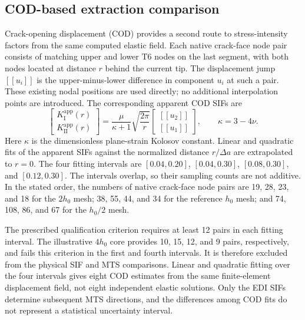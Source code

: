 \documentclass[11pt]{article}
\begin{document}
\subsection{COD-based extraction comparison}
\label{sec:cod-extraction}
Crack-opening displacement (COD) provides a second route to
stress-intensity factors from the same computed elastic field.
Each native crack-face node pair consists of matching upper and
lower T6 nodes on the last segment, with both nodes located at
distance $r$ behind the current tip. The displacement jump
$[\![u_i]\!]$ is the upper-minus-lower difference in component
$u_i$ at such a pair. These existing nodal positions are used
directly; no additional interpolation points are introduced.
The corresponding apparent COD SIFs are
\begin{equation}
 \begin{bmatrix}K_{\mathrm{I}}^{\mathrm{app}}(r)\\K_{\mathrm{II}}^{\mathrm{app}}(r)\end{bmatrix}
 =\frac{\mu}{\kappa+1}\sqrt{\frac{2\pi}{r}}
 \begin{bmatrix}{[\![u_2]\!]}\\{[\![u_1]\!]}\end{bmatrix},
 \qquad \kappa=3-4\nu.\label{eq:cod}
\end{equation}
Here $\kappa$ is the dimensionless plane-strain Kolosov constant.
Linear and quadratic fits of the apparent SIFs against the normalized
distance $r/\Delta a$ are extrapolated to $r=0$. The four fitting
intervals are $[0.04,0.20]$, $[0.04,0.30]$, $[0.08,0.30]$, and
$[0.12,0.30]$. The intervals overlap, so their sampling counts are
not additive. In the stated order, the numbers of native crack-face
node pairs are 19, 28, 23, and 18 for the $2h_0$ mesh;
38, 55, 44, and 34 for the reference $h_0$ mesh; and
74, 108, 86, and 67 for the $h_0/2$ mesh.

The prescribed qualification criterion requires at least 12 pairs
in each fitting interval. The illustrative $4h_0$ core provides
10, 15, 12, and 9 pairs, respectively, and fails this criterion
in the first and fourth intervals. It is therefore excluded from
the physical SIF and MTS comparisons. Linear and quadratic fitting
over the four intervals gives eight COD estimates from the same
finite-element displacement field, not eight independent elastic
solutions. Only the EDI SIFs determine subsequent MTS directions,
and the differences among COD fits do not represent a statistical
uncertainty interval.
\end{document}
